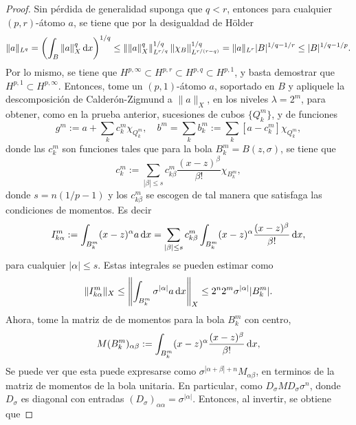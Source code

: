 \begin{proof}
	Sin pérdida de generalidad suponga que $q<r$, entonces para cualquier $(p,r)$-átomo $a$, se tiene que por la desigualdad de Hölder
	\begin{equation*}
		\|a\|_{L^q}=\left(\int_B \|a\|_X^q \mathop{}\!\mathrm{d} x\right)^{1/q} \leq \left\|\|a\|_X^q\right\|_{L^{r/q}}^{1/q} \|\chi_B\|_{L^{r/(r-q)}}^{1/q} = \|a\|_{L^r} |B|^{1/q-1/r} \leq |B|^{1/q-1/p}. 
	\end{equation*}
	Por lo mismo, se tiene que $H^{p,\infty}\subset H^{p,r}\subset H^{p,q}\subset H^{p,1}$, y basta demostrar que $H^{p,1}\subset H^{p,\infty}$. Entonces, tome un $(p,1)$-átomo $a$, soportado en $B$ y apliquele la descomposición de Calderón-Zigmund a $\|a\|_X$, en los niveles $\lambda=2^m$, para obtener, como en la prueba anterior, sucesiones de cubos $\{Q_k^m\}$, y de funciones
	\begin{equation*}
		g^m := a + \sum_k c^m_k\chi_{Q_k^m}, \quad b^m = \sum_k b_k^m := \sum_k [a-c_k^m]\chi_{Q_k^m},
	\end{equation*}
	 donde las $c_k^m$ son funciones tales que para la bola $B_k^m = B(z, \sigma)$, se tiene que
	\begin{equation*}
		c_k^m := \sum_{|\beta|\leq s} c_{k\beta}^m \frac{(x-z)^\beta}{\beta!}\chi_{B_k^m},
	\end{equation*}
	donde $s=n(1/p-1)$ y los $c_{k\beta}^m$ se escogen de tal manera que satisfaga las condiciones de momentos. Es decir 
	\begin{equation*}
		I_{k\alpha}^m := \int_{B_k^m} (x-z)^\alpha a \mathop{}\!\mathrm{d} x = \sum_{|\beta|\leq s} c_{k\beta}^m\int_{B_k^m} (x-z)^\alpha \frac{(x-z)^\beta}{\beta!} \mathop{}\!\mathrm{d} x,
	\end{equation*}
	para cualquier $|\alpha|\leq s$. Estas integrales se pueden estimar como
	\begin{equation*}
		\|I_{k\alpha}^m\|_X \leq  \left\|\int_{B_k^m} \sigma^{|\alpha|} a \mathop{}\!\mathrm{d} x\right\|_X \leq 2^n 2^m \sigma^{|\alpha|}|{B_k^m}|.
	\end{equation*}
	Ahora, tome la matriz de de momentos para la bola $B_k^m$ con centro,
	\begin{equation*}
		M({B_k^m})_{\alpha\beta} := \int_{B_k^m} (x-z)^\alpha \frac{(x-z)^\beta}{\beta!} \mathop{}\!\mathrm{d} x,
	\end{equation*}
	Se puede ver que esta puede expresarse como $\sigma^{|\alpha+\beta|+n}M_{\alpha\beta}$, en terminos de la matriz de momentos de la bola unitaria. En particular, como $D_\sigma MD_\sigma \sigma^{n}$, donde $D_\sigma$ es diagonal con entradas $(D_\sigma)_{\alpha\alpha} = \sigma^{|\alpha|}$. Entonces, al invertir, se obtiene que 

\end{proof}
